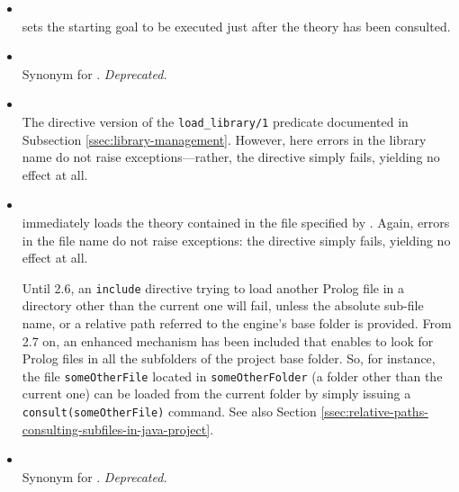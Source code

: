 \begin{itemize}

\item {}\\
     \noindent{} sets the starting goal to be executed just
     after the theory has been consulted.


\item {}\\
     \noindent Synonym for . \emph{Deprecated.}


\item {}\\
     The directive version of the \texttt{load\_library/1} predicate documented in Subsection \ref{ssec:library-management}. However, here errors in the library name do not raise exceptions---rather, the directive simply fails, yielding no effect at all.

\item {}\\
     \noindent{} immediately loads the theory contained in the file specified by . Again, errors in the file name do not raise exceptions: the directive simply fails, yielding no effect at all.
     
     Until \tuprolog{} 2.6, an \texttt{include} directive trying to load another Prolog file in a directory other than the
     current one will fail, unless the absolute sub-file name, or a relative path referred to the engine's base folder is provided. From \tuprolog{} 2.7 on, an enhanced mechanism has been included that enables \tuprolog{} to look for Prolog 
     files in all the subfolders of the project base folder. So, for instance, the file \texttt{someOtherFile} located in \texttt{someOtherFolder} (a folder other than the current one) can be loaded from the current folder by simply issuing 
     a \texttt{consult(someOtherFile)} command. See also Section \ref{ssec:relative-paths-consulting-subfiles-in-java-project}.


\item {}\\
     \noindent Synonym for . \emph{Deprecated.}


\end{itemize}

